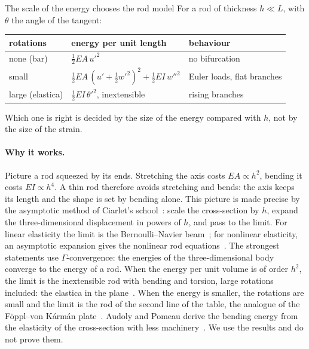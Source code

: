 \begin{gbox}{The scale of the energy chooses the rod model}\label{sec:rd-scales}
%
For a rod of thickness $h \ll L$, with $\theta$ the angle of the tangent:
\begin{center}
\begin{tabular}{@{}lll@{}}
  \toprule
  rotations & energy per unit length & behaviour \\
  \midrule
  none (bar) & $\tfrac12 EA\,u'^2$ & no bifurcation \\
  small & $\tfrac12 EA\,(u' + \tfrac12 w'^2)^2 + \tfrac12 EI\,w''^2$ & Euler loads, flat branches \\
  large (elastica) & $\tfrac12 EI\,\theta'^2$, inextensible & rising branches \\
  \bottomrule
\end{tabular}
\end{center}
Which one is right is decided by the size of the energy compared with $h$, not by the
size of the strain.
\end{gbox}

\paragraph{Why it works.}
Picture a rod squeezed by its ends. Stretching the axis costs $EA \propto h^2$, bending it
costs $EI \propto h^4$. A thin rod therefore avoids stretching and bends: the axis keeps its
length and the shape is set by bending alone. This picture is made precise by the
asymptotic method of Ciarlet's school~\cite{rd-ciarlet1988}: scale the cross-section by
$h$, expand the three-dimensional displacement in powers of $h$, and pass to the limit.
For linear elasticity the limit is the Bernoulli--Navier beam~\cite{rd-bermudez1984,
rd-trabucho1996}; for nonlinear elasticity, an asymptotic expansion gives the nonlinear
rod equations~\cite{rd-cimetiere1988}. The strongest statements use $\Gamma$-convergence:
the energies of the three-dimensional body converge to the energy of a rod. When the
energy per unit volume is of order $h^2$, the limit is the inextensible rod with bending and
torsion, large rotations included: the elastica in the plane~\cite{rd-mora2003}. When the
energy is smaller, the rotations are small and the limit is the rod of the second line of
the table, the analogue of the F\"oppl--von K\'arm\'an plate~\cite{rd-mora2004}. Audoly and
Pomeau derive the bending energy from the elasticity of the cross-section with less
machinery~\cite[Section~3.3]{rd-audoly2010}. We use the results and do not prove them.

